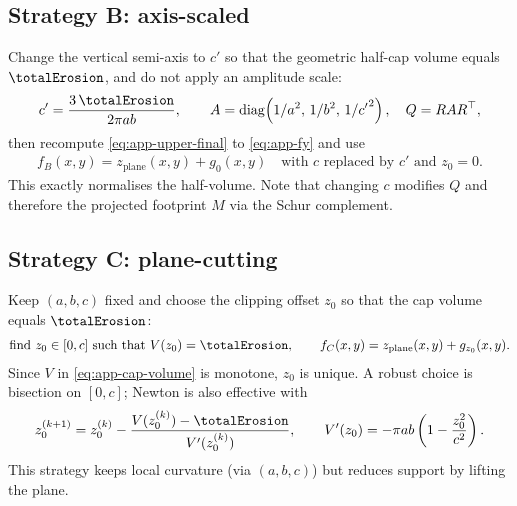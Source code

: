 \subsection*{Strategy B: axis-scaled}
Change the vertical semi-axis to $c'$ so that the geometric half-cap volume equals $\totalErosion$, and do not apply an amplitude scale:
\begin{align}
    \label{eq:app-stratB}
    c'=\frac{3\,\totalErosion}{2\pi a b},\qquad
    A=\operatorname{diag}\!\left(1/a^2,\,1/b^2,\,1/{c'}^{2}\right),\quad Q=RAR^\top,
\end{align}
then recompute \cref{eq:app-upper-final} to \cref{eq:app-fy} and use
\begin{align}
    f_B(x,y)=z_{\text{plane}}(x,y)+g_{0}(x,y)\quad\text{with $c$ replaced by $c'$ and $z_0=0$}.
\end{align}
This exactly normalises the half-volume. Note that changing $c$ modifies $Q$ and therefore the projected footprint $M$ via the Schur complement.

\subsection*{Strategy C: plane-cutting}
Keep $(a,b,c)$ fixed and choose the clipping offset $z_0$ so that the cap volume equals $\totalErosion$:
\begin{align}
    \label{eq:app-stratC}
    \text{find }z_0\in[0,c]\ \text{such that}\ V(z_0)=\totalErosion,\qquad f_C(x,y)=z_{\text{plane}}(x,y)+g_{z_0}(x,y).
\end{align}
Since $V$ in \cref{eq:app-cap-volume} is monotone, $z_0$ is unique. A robust choice is bisection on $[0,c]$; Newton is also effective with
\begin{align}
    z_0^{(k+1)}=z_0^{(k)}-\frac{V(z_0^{(k)})-\totalErosion}{V'(z_0^{(k)})},\qquad
    V'(z_0)=-\pi a b\left(1-\frac{z_0^2}{c^2}\right).
\end{align}
This strategy keeps local curvature (via $(a,b,c)$) but reduces support by lifting the plane.



